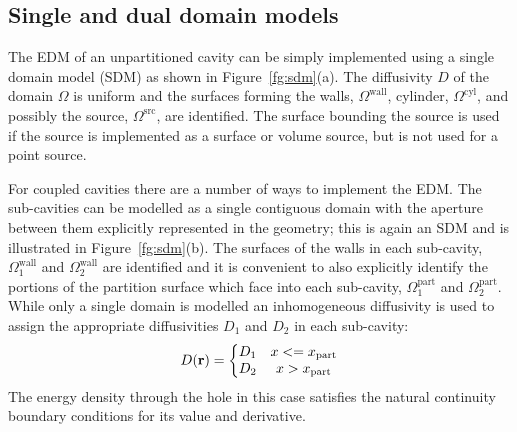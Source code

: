 \documentclass[a4paper]{article}
\numberwithin{equation}{section}
\newcounter{Figure}
\begin{document}
\subsection[Single and dual domain models]{Single and dual domain models}
\label{sc:tcs:sddm}

The EDM of an unpartitioned cavity can be simply implemented using a single domain model (SDM)
as shown in Figure~\ref{fg:sdm}(a). The diffusivity $D$ of the domain $\Omega$ is uniform and
the surfaces forming the walls, $\Omega^\mathrm{wall}$, cylinder, $\Omega^\mathrm{cyl}$, and 
possibly the source, $\Omega^\mathrm{src}$, are identified. The surface bounding the source is 
used if the source is implemented as a surface or volume source, but is not used for a point source.

For coupled cavities there are a number of ways to implement the EDM. The sub-cavities can
be modelled as a single contiguous domain with the aperture between them explicitly represented in 
the geometry; this is again an SDM and is illustrated in Figure~\ref{fg:sdm}(b). The surfaces
of the walls in each sub-cavity, $\Omega^\mathrm{wall}_1$ and $\Omega^\mathrm{wall}_2$ are identified
and it is convenient to also explicitly identify the portions of the partition surface which face into
each sub-cavity, $\Omega^\mathrm{part}_1$ and $\Omega^\mathrm{part}_2$. While only a single domain
is modelled an inhomogeneous diffusivity is used to assign the appropriate diffusivities $D_1$ and
$D_2$ in each sub-cavity:
\begin{align}
D(\boldsymbol{\mathrm{r}}) = \left\{ 
\begin{matrix}
D_1    &x <= x_\mathrm{part} \\
D_2    &x > x_\mathrm{part} 
\end{matrix}
\right.
\end{align}
The energy density through the hole in this case satisfies the natural continuity boundary conditions
for its value and derivative.
\end{document}
